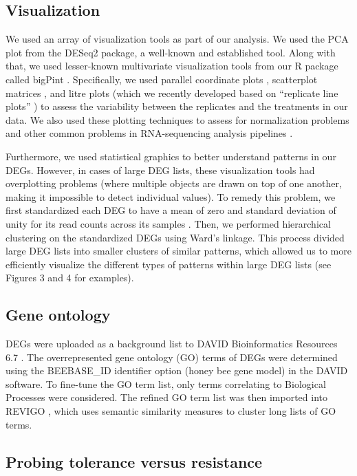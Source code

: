 \documentclass{bmcart}
\begin{document}
\begin{linenumbers}
\begin{doublespacing}
\subsection*{Visualization}

We used an array of visualization tools as part of our analysis. We used the PCA plot \cite{pca} from the DESeq2 package, a well-known and established tool. Along with that, we used lesser-known multivariate visualization tools from our R package called bigPint \cite{bigpint}. Specifically, we used parallel coordinate plots \cite{origPCP}, scatterplot matrices \cite{scatMat}, and litre plots (which we recently developed based on ``replicate line plots'' \cite{jds}) to assess the variability between the replicates and the treatments in our data. We also used these plotting techniques to assess for normalization problems and other common problems in RNA-sequencing analysis pipelines \cite{jds}.

Furthermore, we used statistical graphics to better understand patterns in our DEGs. However, in cases of large DEG lists, these visualization tools had overplotting problems (where multiple objects are drawn on top of one another, making it impossible to detect individual values). To remedy this problem, we first standardized each DEG to have a mean of zero and standard deviation of unity for its read counts across its samples \cite{Chandrasekhar, deSouto}. Then, we performed hierarchical clustering on the standardized DEGs using Ward's linkage. This process divided large DEG lists into smaller clusters of similar patterns, which allowed us to more efficiently visualize the different types of patterns within large DEG lists (see Figures 3 and 4 for examples).

\subsection*{Gene ontology}

DEGs were uploaded as a background list to DAVID Bioinformatics Resources 6.7 \cite{davidBio, davidBio2}. The overrepresented gene ontology (GO) terms of DEGs were determined using the BEEBASE\_ID identifier option (honey bee gene model) in the DAVID software. To fine-tune the GO term list, only terms correlating to Biological Processes were considered. The refined GO term list was then imported into REVIGO \cite{revigo}, which uses semantic similarity measures to cluster long lists of GO terms.

\subsection*{Probing tolerance versus resistance}


\end{doublespacing}
\end{linenumbers}
\end{document}
